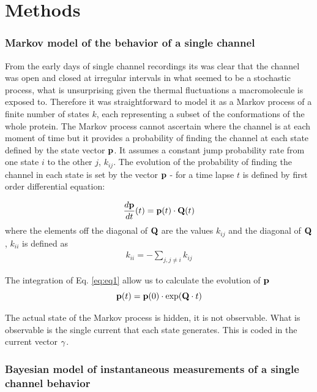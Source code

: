 \documentclass[pdflatex,sn-mathphys-num]{sn-jnl}%
\theoremstyle{thmstyleone}%
\theoremstyle{thmstyletwo}%
\theoremstyle{thmstylethree}%
\begin{document}
\section{Methods}\label{sec11}


\subsubsection{Markov model of the behavior of a single channel}

From the early days of single channel recordings its was clear that the channel was open and closed at irregular intervals in what seemed to be a stochastic process, what is unsurprising given the thermal fluctuations a macromolecule is exposed to. Therefore it was straightforward to model it as a Markov process of a finite number of states $k$, each representing a subset of the conformations of the whole protein. The Markov process cannot ascertain where the channel is at each moment of time but it provides a probability of finding the channel at each state defined by the state vector $\bold p$. It assumes a constant jump probability rate from one state $i$  to the other $j$, $k_{ij}$. The evolution of the probability of finding the channel in each state is set by the vector $\bold p$ - for a time lapse $t$ is defined by first order differential equation: 

\begin{equation}
\frac {d \bold p}{dt}(t) = \bold p(t) \cdot \bold Q (t)
\label{eq:eq1}
\end{equation}
where the elements off the diagonal of $\bold Q$ are the values $k_{ij}$ and the diagonal of $\bold Q$, $k_{ii}$ is defined as
\begin{align}
k_{ii}=- \sum_{j, j \neq i} k_{ij} \label{eq2}
\end{align}



The integration of Eq. \ref{eq:eq1} allow us to calculate the evolution of $ \bold p$
\begin{equation}
\bold p(t) = \bold p(0) \cdot \exp(\bold Q \cdot t)
\label{eq:eq2}
\end{equation}
 

The actual state of the Markov process is hidden, it is not observable. What is observable is the single current that each state generates. This is coded in the current vector $\bold \gamma$. 


\subsubsection{Bayesian model of instantaneous measurements of a single channel behavior}
\end{document}
